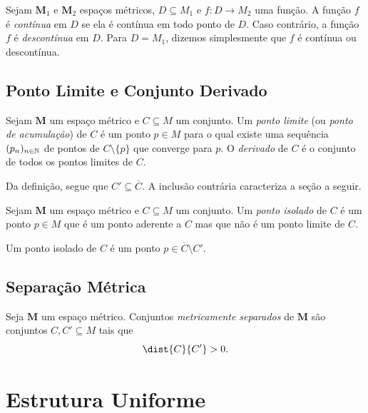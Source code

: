 \begin{defi}
Sejam $\bm M_1$ e $\bm M_2$ espaços métricos, $D \subseteq M_1$ e $f: D \to M_2$ uma função. A função $f$ é \emph{contínua} em $D$ se ela é contínua em todo ponto de $D$. Caso contrário, a função $f$ é \emph{descontínua} em $D$. Para $D=M_1$, dizemos simplesmente que $f$ é contínua ou descontínua.
\end{defi}

\subsection{Ponto Limite e Conjunto Derivado}

\begin{defi}
Sejam $\bm M$ um espaço métrico e $C \subseteq M$ um conjunto. Um \emph{ponto limite} (ou \emph{ponto de acumulação}) de $C$ é um ponto $p \in M$ para o qual existe uma sequência $(p_n)_{n \in \mathbb{N}}$ de pontos de $C \setminus \{p\}$ que converge para $p$. O \emph{derivado} de $C$ é o conjunto de todos os pontos limites de $C$. 
\end{defi}

Da definição, segue que $C' \subseteq \overline C$. A inclusão contrária caracteriza a seção a seguir.

\begin{defi}
Sejam $\bm M$ um espaço métrico e $C \subseteq M$ um conjunto. Um \emph{ponto isolado} de $C$ é um ponto $p \in M$ que é um ponto aderente a $C$ mas que não é um ponto limite de $C$.
\end{defi}

Um ponto isolado de $C$ é um ponto $p \in \overline C \setminus C'$.

\subsection{Separação Métrica}

\begin{defi}
Seja $\bm M$ um espaço métrico. Conjuntos \emph{metricamente separados} de $\bm M$ são conjuntos $C,C' \subseteq M$ tais que
	\begin{equation*}
	\dist{C}{C'} > 0.
	\end{equation*}
\end{defi}

\section{Estrutura Uniforme}


